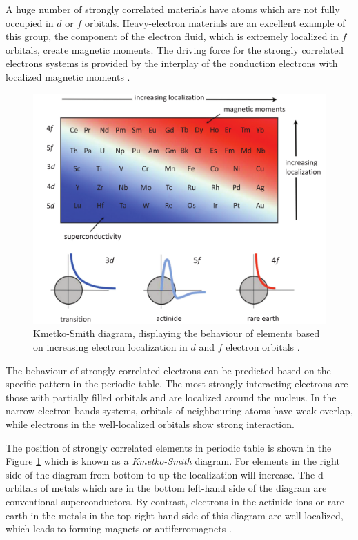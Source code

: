 A huge number of strongly correlated materials have atoms which are not fully occupied in $d$ or $f$ orbitals. Heavy-electron materials are an excellent example of this group, the component of the electron fluid, which is extremely localized in $f$ orbitals, create magnetic moments. The driving force for the strongly correlated electrons systems is provided by the interplay of the conduction electrons with localized magnetic moments \cite{Piers}.
\begin{figure}[ht]
\centering
    \includegraphics[width=1\linewidth]{fig1/1.png}
    
\caption{Kmetko-Smith diagram, displaying the behaviour of elements based on increasing electron localization in $d$ and $f$ electron orbitals \cite{Piers}. \label{fig:periodic table}}
\end{figure} 

The behaviour of strongly correlated electrons can be predicted based on the specific pattern in the periodic table. The most strongly interacting electrons are those with partially filled orbitals and are localized around the nucleus. In the narrow electron bands systems, orbitals of neighbouring atoms have weak overlap, while electrons in the well-localized orbitals show strong interaction\cite{Piers}.



The position of strongly correlated elements in periodic table is shown in the Figure  \ref{fig:periodic table} which is known as a \emph{Kmetko-Smith} diagram. For elements in the right side of the diagram from bottom to up the localization will increase. The d-orbitals of metals which are in the bottom left-hand side of the diagram are conventional superconductors. By contrast, electrons in the actinide ions or rare-earth in the metals in the top right-hand side of this diagram are well localized, which leads to forming magnets or antiferromagnets \cite{Piers}.





